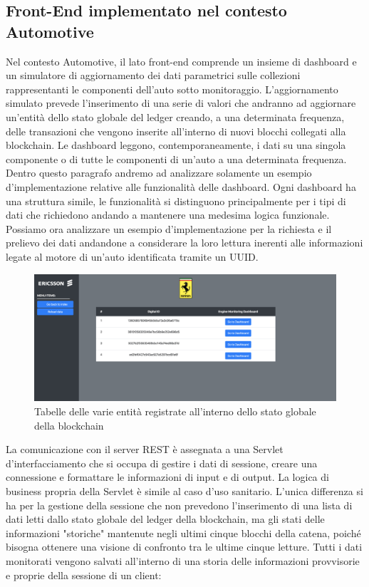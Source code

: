 \subsection{Front-End implementato nel contesto Automotive}
Nel contesto Automotive, il lato front-end comprende un insieme di dashboard e un simulatore di aggiornamento dei dati parametrici sulle collezioni rappresentanti le componenti dell'auto sotto monitoraggio. L'aggiornamento simulato prevede l'inserimento di una serie di valori che andranno ad aggiornare un'entità dello stato globale del ledger creando, a una determinata frequenza, delle transazioni che vengono inserite all'interno di nuovi blocchi collegati alla blockchain. Le dashboard leggono, contemporaneamente, i dati su una singola componente o di tutte le componenti di un'auto a una determinata frequenza. Dentro questo paragrafo andremo ad analizzare solamente un esempio d'implementazione relative alle funzionalità delle dashboard. Ogni dashboard ha una struttura simile, le funzionalità si distinguono principalmente per i tipi di dati che richiedono andando a mantenere una medesima logica funzionale. Possiamo ora analizzare un esempio d'implementazione per la richiesta e il prelievo dei dati andandone a considerare la loro lettura inerenti alle informazioni legate al motore di un'auto identificata tramite un UUID.
\begin{figure}[h]
    \centering
    \includegraphics[width=1\textwidth]{img/table_engine_dash.png}
    \caption{Tabelle delle varie entità registrate all'interno dello stato globale della blockchain}
    \label{fig:table_dash}
\end{figure}
La comunicazione con il server REST è assegnata a una Servlet d'interfacciamento che si occupa di gestire i dati di sessione, creare una connessione e formattare le informazioni di input e di output. La logica di business propria della Servlet è simile al caso d'uso sanitario. L'unica differenza si ha per la gestione della sessione che non prevedono l'inserimento di una lista di dati letti dallo stato globale del ledger della blockchain, ma gli stati delle informazioni "storiche" mantenute negli ultimi cinque blocchi della catena, poiché bisogna ottenere una visione di confronto tra le ultime cinque letture. Tutti i dati monitorati vengono salvati all'interno di una storia delle informazioni provvisorie e proprie della sessione di un client:
